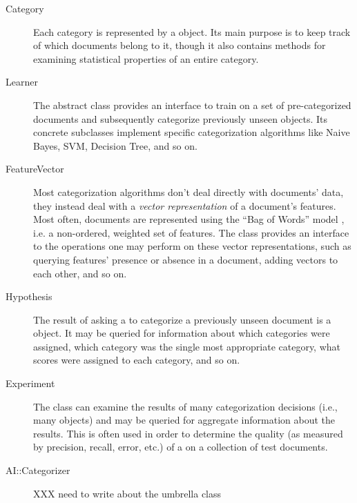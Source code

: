 \documentclass[a4paper]{report}
\begin{document}
\begin{description}
\item[Category]

Each category is represented by a  object.  Its main purpose
is to keep track of which documents belong to it, though it also
contains methods for examining statistical properties of an entire
category.

\item[Learner]

The abstract  class provides an interface to train on a
set of pre-categorized documents and subsequently categorize
previously unseen  objects.  Its
concrete subclasses implement specific categorization algorithms like
Naive Bayes, SVM, Decision Tree, and so on.

\item[FeatureVector]

Most categorization algorithms don't deal directly with documents'
data, they instead deal with a \emph{vector representation} of a
document's features.  Most often, documents are represented using the
``Bag of Words'' model \cite{XXX}, i.e. a non-ordered, weighted set of
features.  The  class provides an interface to the
operations one may perform on these vector representations, such as
querying features' presence or absence in a document, adding vectors
to each other, and so on.

\item[Hypothesis]

The result of asking a  to categorize a previously unseen
document is a  object.  It may be queried for information
about which categories were assigned, which category was the single
most appropriate category, what scores were assigned to each category,
and so on.

\item[Experiment]

The  class can examine the results of many categorization
decisions (i.e., many  objects) and may be queried for
aggregate information about the results.  This is often used in order
to determine the quality (as measured by precision, recall, error,
etc.) of a  on a collection of test documents.

\item[AI::Categorizer]

XXX need to write about the umbrella class

\end{description}
\end{document}
